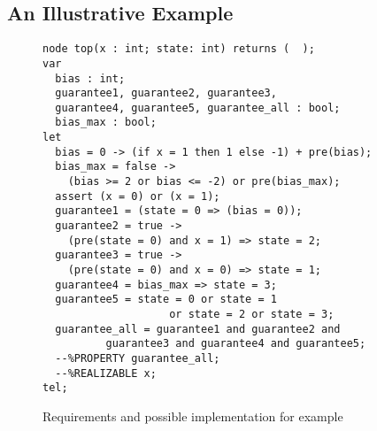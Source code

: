 \subsection{An Illustrative Example}

\begin{figure}[t!]
\centering
\begin{minipage}[c]{0.6\textwidth}
\begin{Verbatim}[fontsize=\scriptsize]
node top(x : int; state: int) returns (  );
var
  bias : int;
  guarantee1, guarantee2, guarantee3,
  guarantee4, guarantee5, guarantee_all : bool;
  bias_max : bool;
let
  bias = 0 -> (if x = 1 then 1 else -1) + pre(bias);
  bias_max = false ->
	(bias >= 2 or bias <= -2) or pre(bias_max);
  assert (x = 0) or (x = 1);
  guarantee1 = (state = 0 => (bias = 0));
  guarantee2 = true ->
  	(pre(state = 0) and x = 1) => state = 2;
  guarantee3 = true ->
  	(pre(state = 0) and x = 0) => state = 1;
  guarantee4 = bias_max => state = 3;
  guarantee5 = state = 0 or state = 1
                    or state = 2 or state = 3;
  guarantee_all = guarantee1 and guarantee2 and
          guarantee3 and guarantee4 and guarantee5;
  --%PROPERTY guarantee_all;
  --%REALIZABLE x;
tel;
 \end{Verbatim}
\end{minipage}
\caption{Requirements and possible implementation for example}
\label{fg:example}
\end{figure}

